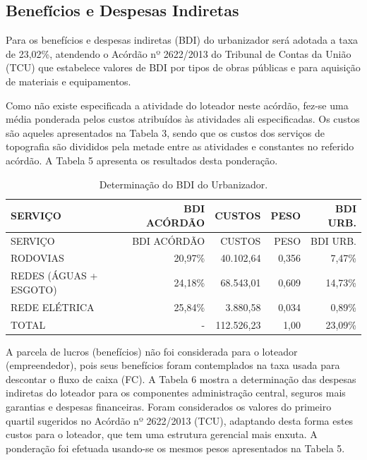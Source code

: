 \documentclass[
  10pt,
  a4paper]{article}
\begin{document}
\subsection{Benefícios e Despesas
Indiretas}\label{benefuxedcios-e-despesas-indiretas}

Para os benefícios e despesas indiretas (BDI) do urbanizador será
adotada a taxa de 23,02\%, atendendo o Acórdão nº 2622/2013 do Tribunal
de Contas da União (TCU) que estabelece valores de BDI por tipos de
obras públicas e para aquisição de materiais e equipamentos.

Como não existe especificada a atividade do loteador neste acórdão,
fez-se uma média ponderada pelos custos atribuídos às atividades ali
especificadas. Os custos são aqueles apresentados na Tabela 3, sendo que
os custos dos serviços de topografia são divididos pela metade entre as
atividades  e 
constantes no referido acórdão. A Tabela 5 apresenta os resultados desta
ponderação.

\begin{longtable}[]{@{}lrrrr@{}}
\caption{Determinação do BDI do Urbanizador.}\tabularnewline
\toprule\noalign{}
SERVIÇO & BDI ACÓRDÃO & CUSTOS & PESO & BDI URB. \\
\midrule\noalign{}
\endfirsthead
\toprule\noalign{}
SERVIÇO & BDI ACÓRDÃO & CUSTOS & PESO & BDI URB. \\
\midrule\noalign{}
\endhead
\bottomrule\noalign{}
\endlastfoot
RODOVIAS & 20,97\% & 40.102,64 & 0,356 & 7,47\% \\
REDES (ÁGUAS + ESGOTO) & 24,18\% & 68.543,01 & 0,609 & 14,73\% \\
REDE ELÉTRICA & 25,84\% & 3.880,58 & 0,034 & 0,89\% \\
TOTAL & - & 112.526,23 & 1,00 & 23,09\% \\
\end{longtable}

A parcela de lucros (benefícios) não foi considerada para o loteador
(empreendedor), pois seus benefícios foram contemplados na taxa usada
para descontar o fluxo de caixa (FC). A Tabela 6 mostra a determinação
das despesas indiretas do loteador para os componentes administração
central, seguros mais garantias e despesas financeiras. Foram
considerados os valores do primeiro quartil sugeridos no Acórdão nº
2622/2013 (TCU), adaptando desta forma estes custos para o loteador, que
tem uma estrutura gerencial mais enxuta. A ponderação foi efetuada
usando-se os mesmos pesos apresentados na Tabela 5.
\end{document}
